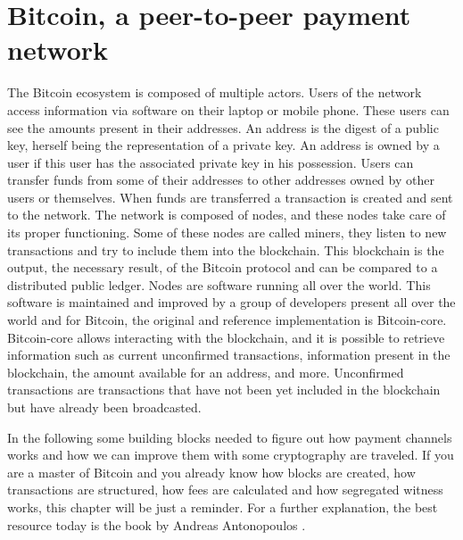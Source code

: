 \chapter{Bitcoin, a peer-to-peer payment network}
\label{chap:bitcoin}

The Bitcoin ecosystem is composed of multiple actors. Users of the network
access information via software on their laptop or mobile phone. These users can
see the amounts present in their addresses. An address is the digest of a public
key, herself being the representation of a private key. An address is owned by a
user if this user has the associated private key in his possession. Users can
transfer funds from some of their addresses to other addresses owned by other
users or themselves. When funds are transferred a transaction is created and
sent to the network. The network is composed of nodes, and these nodes take care
of its proper functioning. Some of these nodes are called miners, they listen to
new transactions and try to include them into the blockchain. This blockchain is
the output, the necessary result, of the Bitcoin protocol and can be compared to
a distributed public ledger. Nodes are software running all over the world. This
software is maintained and improved by a group of developers present all over
the world and for Bitcoin, the original and reference implementation is
Bitcoin-core. Bitcoin-core allows interacting with the blockchain, and it is
possible to retrieve information such as current unconfirmed transactions,
information present in the blockchain, the amount available for an address, and
more. Unconfirmed transactions are transactions that have not been yet included
in the blockchain but have already been broadcasted.

In the following some building blocks needed to figure out how payment channels
works and how we can improve them with some cryptography are traveled. If you
are a master of Bitcoin and you already know how blocks are created, how
transactions are structured, how fees are calculated and how segregated witness
works, this chapter will be just a reminder. For a further explanation, the best
resource today is the book  by Andreas Antonopoulos
\cite{Antonopoulos:2014:MBU:2695500}.


\minitoc

\newpage

